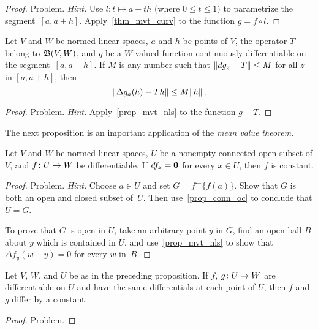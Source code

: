 \begin{proof} Problem.   \emph{Hint.}   Use $l\colon t \mapsto a + th$ (where $0 \le t \le 1$)
to parametrize the segment~$[a,a + h]$. Apply~\ref{thm_mvt_curv} to the function $g = f \circ
l$.  \ns
\end{proof}

\begin{cor}\label{cor_mvt_nls}  Let $V$ and $W$ be normed linear
spaces, $a$ and $h$ be points of $V$, the operator $T$ belong to $\mathfrak{B}(V,W)$, and $g$ be a
$W$ valued function continuously differentiable on the segment~$[a,a+h]$.  If $M$ is any
number such that $\lVert dg_z - T\rVert \le M$ for all $z$ in $[a,a + h]$, then
  \[ \lVert\Delta g_a(h) - Th\rVert \le M\lVert h\rVert\,. \]
\end{cor}

\begin{proof} Problem.  \emph{Hint.}  Apply~\ref{prop_mvt_nls} to the function $g - T$.    \ns
\end{proof}

The next proposition is an important application of the \emph{mean value theorem}.

\begin{prop}\label{prop_sc_const} Let $V$ and $W$ be normed linear spaces, $U$ be a nonempty
connected open subset of $V$, and $f\colon U \rightarrow W$ be differentiable.  If $df_x = \mathbf{0}$ for
every $x \in U$, then $f$ is constant.
\end{prop}

\begin{proof} Problem.   \emph{Hint.}  Choose $a \in U$ and set $G = f^\gets \{f(a)\}$.  Show
that $G$ is both an open and closed subset of~$U$.  Then use~\ref{prop_conn_oc} to conclude
that $U=G$.

To prove that $G$ is open in $U$, take an arbitrary point $y$ in $G$, find an open ball $B$
about $y$ which is contained in $U$, and use~\ref{prop_mvt_nls} to show that $\Delta f_y(w -
y) = 0$ for every $w$ in~$B$.   \ns
\end{proof}

\begin{cor}\label{cor_const_diff}  Let $V$, $W$, and $U$ be as in the preceding proposition.
If $f$, $g \colon U \rightarrow W$ are differentiable on $U$ and have the same differentials at each
point of $U$, then $f$ and $g$ differ by a constant.
\end{cor}

\begin{proof} Problem.   \ns  \end{proof}

